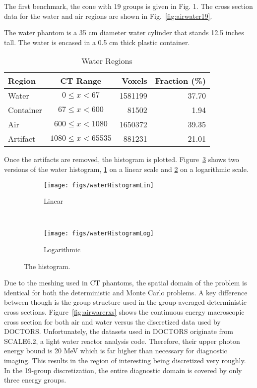 The first benchmark, the cone with 19 groups is given in Fig. 1. The cross section data for the water and air regions are shown in Fig.~\ref{fig:airwater19}.

The water phantom is a 35 cm diameter water cylinder that stands 12.5 inches tall. The water is encased in a 0.5 cm thick plastic container.

\begin{table}[ht]
\caption{Water Regions}
\centering 
\begin{tabular}{l c r r}
\hline \hline   
Region    & CT Range & Voxels & Fraction (\%)\\ [0.5ex] 
\hline
Water     & $0 \leq x < 67$ & 1581199 & 37.70 \\
Container & $67 \leq x < 600$ & 81502 & 1.94 \\
Air       & $600 \leq x < 1080$ & 1650372  & 39.35 \\
Artifact  & $1080 \leq x < 65535$ & 881231 & 21.01 \\  [1ex]
\hline
\end{tabular}
\label{table:nonlin}
\end{table}

Once the artifacts are removed, the histogram is plotted. Figure~\ref{fig:waterHist} shows two versions of the water histogram, \ref{fig:waterHistLin} on a linear scale and \ref{fig:waterHistLog} on a logarithmic scale.

\begin{figure}
    \centering
    \begin{subfigure}[b]{0.45\textwidth}
        \texttt{[image: figs/waterHistogramLin]}
        \caption{Linear}
        \label{fig:waterHistLin}
    \end{subfigure}
    ~
    \begin{subfigure}[b]{0.45\textwidth}
        \texttt{[image: figs/waterHistogramLog]}
        \caption{Logarithmic}
        \label{fig:waterHistLog}
    \end{subfigure}
    \caption{The histogram.}\label{fig:waterHist}
\end{figure}

Due to the meshing used in CT phantoms, the spatial domain of the problem is identical for both the deterministic and Monte Carlo problems. A key difference between though is the group structure used in the group-averaged deterministic cross sections. Figure~\ref{fig:airwarerxs} shows the continuous energy macroscopic cross section for both air and water versus the discretized data used by DOCTORS. Unfortunately, the datasets used in DOCTORS originate from SCALE6.2, a light water reactor analysis code. Therefore, their upper photon energy bound is 20 MeV which is far higher than necessary for diagnostic imaging. This results in the region of interesting being discretized very roughly. In the 19-group discretization, the entire diagnostic domain is covered by only three energy groups.

